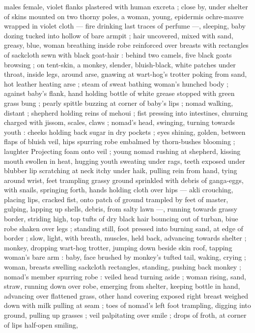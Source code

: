 males female, violet flanks plastered with human excreta ; close by,
under shelter of skins mounted on two thorny poles, a woman,
young, epidermis ochre-mauve wrapped in violet cloth --- fire
drinking last traces of perfume ---, sleeping, baby dozing tucked into
hollow of bare armpit ; hair uncovered, mixed with sand, greasy,
blue, woman breathing inside robe reinforced over breasts with
rectangles of sackcloth sewn with black goat-hair : behind two
camels, five black goats browsing ; on tent-skin, a monkey, slender,
bluish-black, white patches under throat, inside legs, around arse,
gnawing at wart-hog's trotter poking from sand, hot leather heating
arse ; steam of sweat bathing woman's hunched body ; against
baby’s flank, hand holding bottle of white grease stopped with green
grass bung ; pearly spittle buzzing at corner of baby’s lips ; nomad
walking, distant ; shepherd holding reins of mehoui ; fist pressing
into intestines, churning charged with jissom, scales, claws ; nomad’s
head, swinging, turning towards youth : cheeks holding back sugar
in dry pockets ; eyes shining, golden, between flaps of bluish veil,
hips spurring robe embalmed by thorn-bushes blooming ; laughter
Projecting foam onto veil ; young nomad rushing at shepherd, kissing
mouth swollen in heat, hugging youth sweating under rags, teeth
exposed under blubber lip scratching at neck itchy under haik,
pulling rein from hand, tying around wrist, feet trampling grassy
ground sprinkled with debris of ganga-eggs, with snails, springing
forth, hands holding cloth over hips --- akli crouching, placing lips,
cracked fist, onto patch of ground trampled by feet of master,
gulping, lapping up shells, debris, from salty lawn ---, running
towards grassy border, striding high, top tufts of dry black hair
bouncing out of turban, biue robe shaken over legs ; standing still,
foot pressed into burning sand, at edge of border ; slow, light, with
breath, muscles, held back, advancing towards shelter ; monkey,
dropping wart-hog trotter, jumping down beside skin roof, tapping
woman's bare arm : baby, face brushed by monkey's tufted tail,
waking, crying ; woman, breasts swelling sackcloth rectangles,
standing, pushing back monkey ; nomad’s member spurring robe :
veiled head turning aside ; woman rising, sand, straw, running down
over robe, emerging from shelter, keeping bottle in hand, advancing
over flattened grass, other hand covering exposed right breast
weighed down with milk pulling at seam ; toes of nomad's left foot
trampling, digging into ground, pulling up grasses ; veil palpitating
over smile ; drops of froth, at corner of lips half-open smiling,

